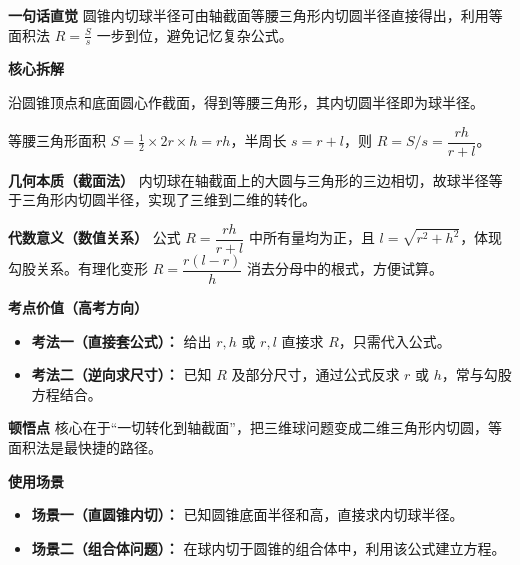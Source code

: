 \begin{explanationbox}
	\textbf{\textcolor{CExplanation}{一句话直觉}}
	圆锥内切球半径可由轴截面等腰三角形内切圆半径直接得出，利用等面积法 $R = \frac{S}{s}$ 一步到位，避免记忆复杂公式。

	\medskip
	\textbf{\textcolor{CExplanation}{核心拆解}}
	\begin{description}[style=nextline, leftmargin=2.8em, labelsep=0.5em, itemsep=0.45em]
		\item[\textbf{要点一（轴截面转化）：}]
			沿圆锥顶点和底面圆心作截面，得到等腰三角形，其内切圆半径即为球半径。
		\item[\textbf{要点二（等面积法）：}]
			等腰三角形面积 $S = \frac12\times 2r \times h = rh$，半周长 $s = r+l$，则 $R = S/s = \dfrac{rh}{r+l}$。
	\end{description}

	\medskip
	\textbf{\textcolor{CExplanation}{几何本质（截面法）}}
	内切球在轴截面上的大圆与三角形的三边相切，故球半径等于三角形内切圆半径，实现了三维到二维的转化。

	\medskip
	\textbf{\textcolor{CExplanation}{代数意义（数值关系）}}
	公式 $R = \dfrac{rh}{r+l}$ 中所有量均为正，且 $l = \sqrt{r^2+h^2}$，体现勾股关系。有理化变形 $R = \dfrac{r(l-r)}{h}$ 消去分母中的根式，方便试算。

	\medskip
	\textbf{\textcolor{CExplanation}{考点价值（高考方向）}}
	\begin{itemize}[leftmargin=*, itemsep=0.5em, topsep=0.4em]
		\item \textbf{考法一（直接套公式）：} 给出 $r,h$ 或 $r,l$ 直接求 $R$，只需代入公式。
		\item \textbf{考法二（逆向求尺寸）：} 已知 $R$ 及部分尺寸，通过公式反求 $r$ 或 $h$，常与勾股方程结合。
	\end{itemize}

	\medskip
	\textbf{\textcolor{CExplanation}{顿悟点}}
	核心在于“一切转化到轴截面”，把三维球问题变成二维三角形内切圆，等面积法是最快捷的路径。

	\medskip
	\textbf{\textcolor{CExplanation}{使用场景}}
	\begin{itemize}[leftmargin=*, itemsep=0.5em, topsep=0.4em]
		\item \textbf{场景一（直圆锥内切）：} 已知圆锥底面半径和高，直接求内切球半径。
		\item \textbf{场景二（组合体问题）：} 在球内切于圆锥的组合体中，利用该公式建立方程。
	\end{itemize}

\end{explanationbox}
